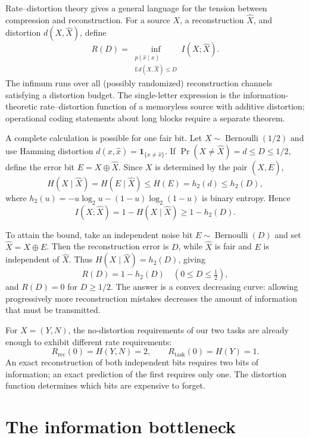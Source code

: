 Rate--distortion theory gives a general language for the tension between compression and reconstruction. For a source \(X\), a reconstruction \(\widehat X\), and distortion \(d(X,\widehat X)\), define
\begin{equation}
 R(D)=\inf_{\substack{p(\widehat x\mid x)\\
          \mathbb E d(X,\widehat X)\leq D}}
          I(X;\widehat X).
 \label{eq:N20261009-RD}
\end{equation}
The infimum runs over all (possibly randomized) reconstruction channels satisfying a distortion budget. The single-letter expression is the information-theoretic rate--distortion function of a memoryless source with additive distortion; operational coding statements about long blocks require a separate theorem.

A complete calculation is possible for one fair bit. Let \(X\sim\operatorname{Bernoulli}(1/2)\) and use Hamming distortion \(d(x,\widehat x)=\mathbf1_{\{x\ne\widehat x\}}\). If \(\Pr(X\ne\widehat X)=d\leq D\leq1/2\), define the error bit \(E=X\oplus\widehat X\). Since \(X\) is determined by the pair \((\widehat X,E)\),
\[
 H(X\mid\widehat X)=H(E\mid\widehat X)
 \leq H(E)=h_2(d)\leq h_2(D),
\]
where \(h_2(u)=-u\log_2u-(1-u)\log_2(1-u)\) is binary entropy. Hence
\[
 I(X;\widehat X)=1-H(X\mid\widehat X)\geq1-h_2(D).
\]

To attain the bound, take an independent noise bit \(E\sim\operatorname{Bernoulli}(D)\) and set \(\widehat X=X\oplus E\). Then the reconstruction error is \(D\), while \(\widehat X\) is fair and \(E\) is independent of \(\widehat X\). Thus \(H(X\mid\widehat X)=h_2(D)\), giving
\begin{equation}
 \boxed{R(D)=1-h_2(D)\quad(0\leq D\leq\tfrac12),}
 \label{eq:N20261009-binaryRD}
\end{equation}
and \(R(D)=0\) for \(D\geq1/2\). The answer is a convex decreasing curve: allowing progressively more reconstruction mistakes decreases the amount of information that must be transmitted.

For \(X=(Y,N)\), the no-distortion requirements of our two tasks are already enough to exhibit different rate requirements:
\[
 R_{\mathrm{rec}}(0)=H(Y,N)=2,\qquad
 R_{\mathrm{task}}(0)=H(Y)=1.
\]
An exact reconstruction of both independent bits requires two bits of information; an exact prediction of the first requires only one. The distortion function determines which bits are expensive to forget.

\section{The information bottleneck}

